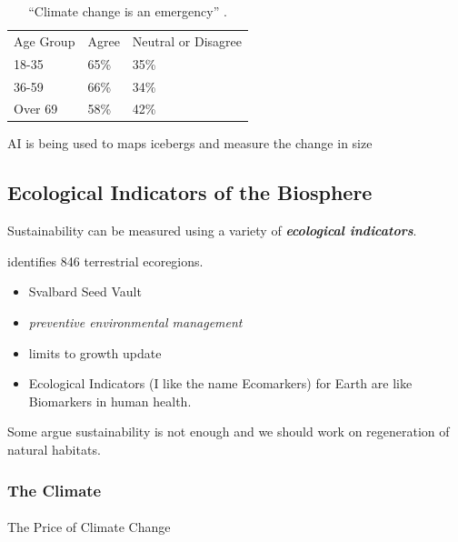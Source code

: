 \documentclass[
  letterpaper,
  DIV=11,
  numbers=noendperiod]{scrartcl}
\makeatletter
\let\oldparagraph\paragraph
\renewcommand{\paragraph}{
    \@ifstar
      \xxxParagraphStar
      \xxxParagraphNoStar
  }
\newcommand{\xxxParagraphStar}[1]{\oldparagraph*{#1}\mbox{}}
\newcommand{\xxxParagraphNoStar}[1]{\oldparagraph{#1}\mbox{}}
\providecommand{\tightlist}{%
  \setlength{\itemsep}{0pt}\setlength{\parskip}{0pt}}\usepackage{longtable,booktabs,array}
\makeatother
\begin{document}
\begin{longtable}[]{@{}lll@{}}
\caption{``Climate change is an emergency''
\citet{undpPeoplesClimateVote2021}.}\tabularnewline
\toprule\noalign{}
\endfirsthead
\endhead
\bottomrule\noalign{}
\endlastfoot
Age Group & Agree & Neutral or Disagree \\
18-35 & 65\% & 35\% \\
36-59 & 66\% & 34\% \\
Over 69 & 58\% & 42\% \\
\end{longtable}

AI is being used to maps icebergs and measure the change in size
\citet{europeanspaceagencyAIMapsIcebergs2023}

\subsection{Ecological Indicators of the
Biosphere}\label{ecological-indicators-of-the-biosphere}

Sustainability can be measured using a variety of
\textbf{\emph{ecological indicators}}.

\citet{dinersteinEcoregionBasedApproachProtecting2017} identifies 846
terrestrial ecoregions.

\begin{itemize}
\tightlist
\item
  Svalbard Seed Vault
\item
  \citet{jacksonMaterialConcernsPollution1996} \emph{preventive
  environmental management}
\item
  \citet{jacksonProsperityGrowthFoundations2017} limits to growth update
\item
  Ecological Indicators (I like the name Ecomarkers) for Earth are like
  Biomarkers in human health.
\end{itemize}

Some argue sustainability is not enough and we should work on
regeneration of natural habitats.

\subsubsection{The Climate}\label{the-climate}

\paragraph{The Price of Climate
Change}\label{the-price-of-climate-change}
\end{document}
